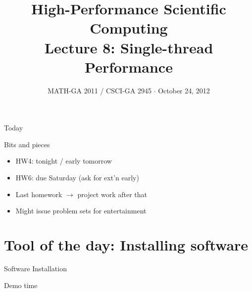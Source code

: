 \documentclass[english,compress]{beamer}
\begin{document}

\title{High-Performance Scientific Computing\\Lecture 8: Single-thread Performance}

\date{MATH-GA 2011 / CSCI-GA 2945 $\cdot$ October 24, 2012}

\frame{\titlepage}

\begin{frame}{Today}
  \tableofcontents[hideallsubsections]
\end{frame}
\begin{frame}{Bits and pieces}
  \begin{itemize}
    \item HW4: tonight / early tomorrow
    \item HW6: due Saturday (ask for ext'n early)
    \item Last homework $\rightarrow$ project work after that
    \item Might issue problem sets for entertainment
  \end{itemize}
\end{frame}
\section[Software]{Tool of the day: Installing software}
\begin{frame}{Software Installation}
  \begin{center}
  \Huge Demo time
  \end{center}
\end{frame}
\end{document}
